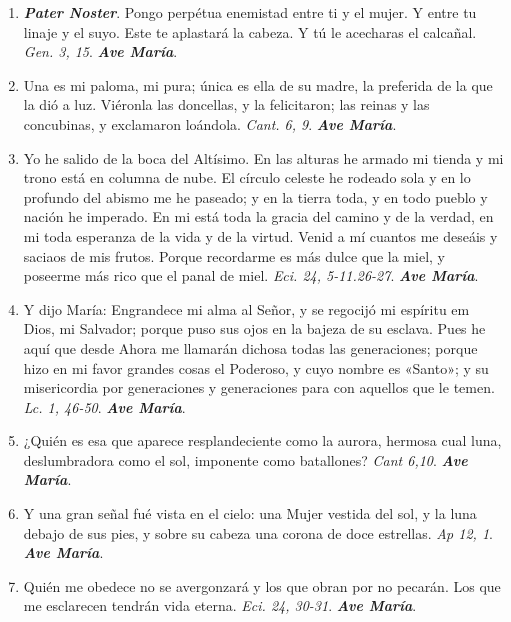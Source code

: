 \documentclass[../../devocionario.tex]{subfiles}
\begin{document}
    \begin{enumerate}

        \item \textbf{\emph{Pater Noster}}. Pongo perpétua enemistad entre ti y el mujer. Y entre tu linaje y el suyo. Este te aplastará la cabeza.
            Y tú le acecharas el calcañal. \emph{Gen. 3, 15}. \textbf{\emph{Ave María}}.
    
        \item Una es mi paloma, mi pura; única es ella de su madre, la preferida de la que la dió a luz. Viéronla las doncellas, 
            y la felicitaron; las reinas y las concubinas, y exclamaron loándola. \emph{Cant. 6, 9}. \textbf{\emph{Ave María}}.

        \item Yo he salido de la boca del Altísimo. En las alturas he armado mi tienda y mi trono está en columna de nube. El círculo celeste he rodeado sola y en lo profundo 
            del abismo me he paseado; y en la tierra toda, y en todo pueblo y nación he imperado. En mi está toda la gracia del camino y de la verdad, en mi toda esperanza de 
            la vida y de la virtud. Venid a mí cuantos me deseáis y saciaos de mis frutos. Porque recordarme es más dulce que la miel, y poseerme más rico que el panal de miel. 
            \emph{Eci. 24, 5-11.26-27}. \textbf{\emph{Ave María}}.

        \item Y dijo María: Engrandece mi alma al Señor, y se regocijó mi espíritu em Dios, mi Salvador; porque puso sus ojos en la bajeza de su esclava. Pues he aquí que desde Ahora
            me llamarán dichosa todas las generaciones; porque hizo en mi favor grandes cosas el Poderoso, y cuyo nombre es «Santo»; y su misericordia por generaciones y generaciones
            para con aquellos que le temen. \emph{Lc. 1, 46-50}. \textbf{\emph{Ave María}}.

        \item ¿Quién es esa que aparece resplandeciente como la aurora, hermosa cual luna, deslumbradora como el sol, imponente como batallones? 
            \emph{Cant 6,10}. \textbf{\emph{Ave María}}.

        \item Y una gran señal fué vista en el cielo: una Mujer vestida del sol, y la luna debajo de sus pies, y sobre su cabeza una corona de doce estrellas. 
            \emph{Ap 12, 1}. \textbf{\emph{Ave María}}.

        \item Quién me obedece no se avergonzará y los que obran por no pecarán. Los que me esclarecen tendrán vida eterna. 
            \emph{Eci. 24, 30-31}. \textbf{\emph{Ave María}}.


\end{enumerate}
\end{document}

